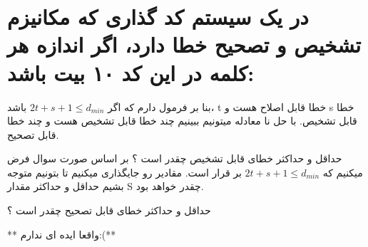 \section{در یک سیستم کد گذاری که مکانیزم تشخیص و تصحیح خطا دارد، اگر اندازه هر کلمه در این کد ۱۰ بیت باشد:}

بنا بر فرمول دارم که اگر $2t + s + 1 \le d_{min}$ باشد، t خطا قابل اصلاح هست و s خطا قابل تشخیص.
با حل نا معادله میتونیم ببینیم چند خطا قابل تشخیص هست و چند خطا قابل تصحیح.

حداقل و حداکثر خطای قابل تشخیص چقدر است ؟
بر اساس صورت سوال فرض میکنیم که $2t + s + 1 \le d_{min}$ بر قرار است. مقادیر رو جایگذاری میکنیم تا بتونیم متوجه بشیم حداقل و حداکثر مقدار S چقدر خواهد بود.


حداقل و حداکثر خطای قابل تصحیح چقدر است ؟

** واقعا ایده ای ندارم‌:(‌**